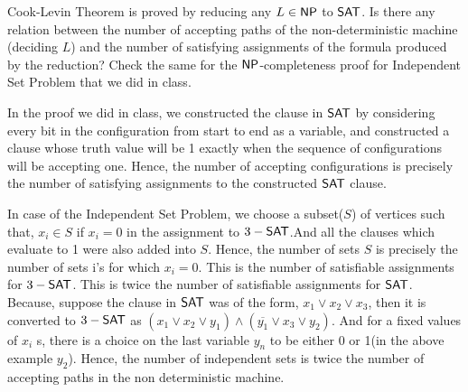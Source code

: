 \documentclass[12pt]{exam}
\begin{document}
\begin{questions}
\begin{solution}
  
  
\end{solution}


\question
Cook-Levin Theorem is proved by reducing any $L \in {\ensuremath{\mathsf{NP}}}$ to ${\mathsf{SAT}}$. Is there any relation between the number of accepting paths of the non-deterministic machine (deciding $L$) and the number of satisfying assignments of the formula produced by the reduction? Check the same for the ${\mathsf{NP}}$-completeness proof for {\sc Independent Set Problem} that we did in class.

\end{questions}

\begin{solution}
\newline
 In the proof we did in class, we constructed the clause in ${\mathsf{SAT}}$ by considering every bit in the configuration from start to end as a variable,
 and constructed a clause whose truth value will be 1 exactly when the sequence of configurations will be accepting one. Hence, the number of accepting
 configurations is precisely the number of satisfying assignments to the constructed ${\mathsf{SAT}}$ clause. \newline
 
 In case of the {\sc Independent Set Problem}, we choose a subset($S$) of vertices such that, \newline
 $x_{i} \in S$ if $x_{i} = 0$ in the assignment to $3-{\mathsf{SAT}}$.And all the clauses which evaluate to 1 were also added into $S$. \newline
 Hence, the number of sets $S$ is precisely the number of sets i's for which $x_{i} = 0$. This is the number of satisfiable assignments for $3-{\mathsf{SAT}}$.
 This is twice the number of satisfiable assignments for ${\mathsf{SAT}}$. Because, suppose the clause in ${\mathsf{SAT}}$ was of the form, $x_{1} \vee x_{2} \vee x_{3}$,
 then it is converted to $3-{\mathsf{SAT}}$ as $(x_{1} \vee x_{2} \vee y_{1}) \wedge (\overline{y_{1}} \vee x_{3} \vee y_{2})$. And for a fixed values of $x_{i}$ s, there
 is a choice on the last variable $y_{n}$ to be either 0 or 1(in the above example $y_{2}$). Hence, the number of independent sets is twice the
 number of accepting paths in the non deterministic machine.
\end{solution}

%
\end{document}
